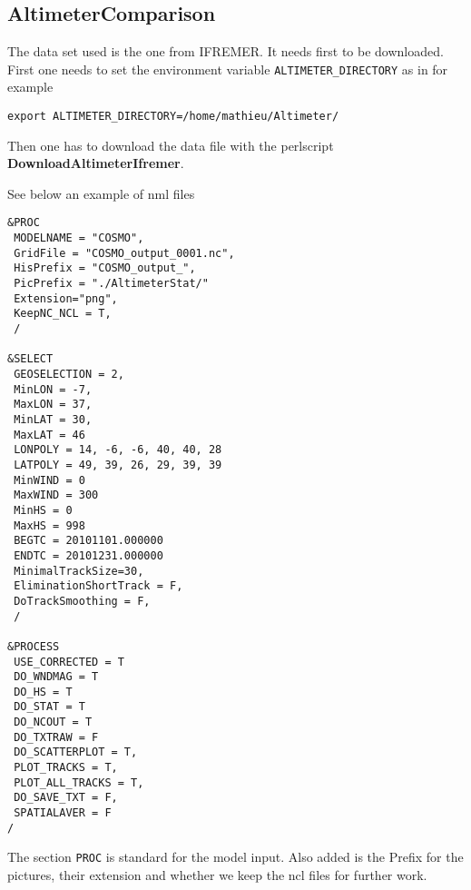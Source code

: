 \documentclass[12pt]{amsart}
\begin{document}
\subsection{AltimeterComparison}

The data set used is the one from IFREMER. It needs first to be downloaded.
First one needs to set the environment variable {\tt ALTIMETER\_DIRECTORY}
as in for example
\begin{verbatim}
export ALTIMETER_DIRECTORY=/home/mathieu/Altimeter/
\end{verbatim}
Then one has to download the data file with the perlscript {\bf DownloadAltimeterIfremer}.

See below an example of nml files
\begin{verbatim}
&PROC
 MODELNAME = "COSMO",
 GridFile = "COSMO_output_0001.nc",
 HisPrefix = "COSMO_output_",
 PicPrefix = "./AltimeterStat/"
 Extension="png",
 KeepNC_NCL = T,
 /

&SELECT
 GEOSELECTION = 2,
 MinLON = -7, 
 MaxLON = 37, 
 MinLAT = 30, 
 MaxLAT = 46
 LONPOLY = 14, -6, -6, 40, 40, 28
 LATPOLY = 49, 39, 26, 29, 39, 39
 MinWIND = 0
 MaxWIND = 300
 MinHS = 0 
 MaxHS = 998
 BEGTC = 20101101.000000
 ENDTC = 20101231.000000
 MinimalTrackSize=30,
 EliminationShortTrack = F,
 DoTrackSmoothing = F,
 /

&PROCESS
 USE_CORRECTED = T
 DO_WNDMAG = T
 DO_HS = T
 DO_STAT = T
 DO_NCOUT = T
 DO_TXTRAW = F
 DO_SCATTERPLOT = T,
 PLOT_TRACKS = T,
 PLOT_ALL_TRACKS = T,
 DO_SAVE_TXT = F,
 SPATIALAVER = F
/
\end{verbatim}
The section {\tt PROC} is standard for the model input. Also added is the Prefix for the pictures, their extension and whether we keep the ncl files for further work.
\end{document}
